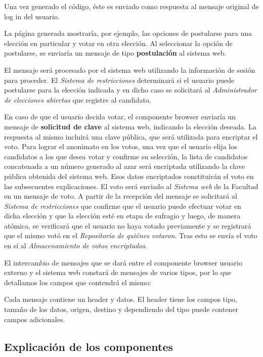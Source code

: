 Una vez generado el código, éste es enviado como respuesta al mensaje original de log in del usuario. 

La página generada mostraría, por ejemplo, las opciones de postularse para una elección en particular y votar en otra elección. Al seleccionar la opción de postularse, se enviaría un mensaje de tipo {\bf postulación} al sistema web. 

El mensaje será procesado por el sistema web utilizando la información de sesión para proceder. 
El \emph{Sistema de restricciones} determinará si el usuario puede postularse para la elección indicada y en dicho caso se solicitará al \emph{Administrador de elecciones abiertas} que registre al candidato. 


En caso de que el usuario decida votar, el componente browser enviaría un mensaje de {\bf solicitud de clave} al sistema web, indicando la elección deseada. 
La respuesta al mismo incluirá una clave pública, que será utilizada para encriptar el voto. 
Para lograr el anonimato en los votos, una vez que el usuario elija los candidatos a los que desea votar y confirme su selección, la lista de candidatos concatenada a un número generado al azar será encriptada utilizando la clave pública obtenida del sistema web. 
Esos datos encriptados constituirán el voto en las subsecuentes explicaciones. 
El voto será enviado al \emph{Sistema web} de la Facultad en un mensaje de voto. 
A partir de la recepción del mensaje se solicitará al \emph{Sistema de restricciones} que confirme que el usuario puede efectuar votar en dicha elección y que la elección esté en etapa de sufragio y luego, de manera atómica, se verificará que el usuario no haya votado previamente y se registrará que el mismo votó en el \emph{Repositorio de quiénes votaron}. 
Tras esto se envía el voto en sí al \emph{Almacenamiento de votos encriptados}.



El intercambio de mensajes que se dará entre el componente browser usuario externo y el sistema web constará de mensajes de varios tipos, por lo que detallamos los campos que contendrá el mismo:

Cada mensaje contiene un header y datos. El header tiene los campos tipo, tamaño de los datos, origen, destino y dependiendo del tipo puede contener campos adicionales. 

\subsection{Explicación de los componentes}

